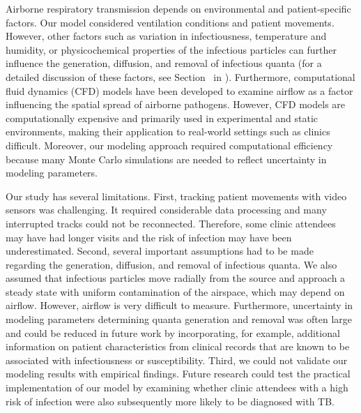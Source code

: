 \documentclass[fleqn,11pt]{wlscirep}
\begin{document}
Airborne respiratory transmission depends on environmental and patient-specific factors. Our model considered ventilation conditions and patient movements. However, other factors such as variation in infectiousness, temperature and humidity, or physicochemical properties of the infectious particles can further influence the generation, diffusion, and removal of infectious quanta (for a detailed discussion of these factors, see Section~ in \supp). Furthermore, computational fluid dynamics (CFD) models have been developed to examine airflow as a factor influencing the spatial spread of airborne pathogens\cite{Vuorinen2020SafSci,Jung2021InfectChemo,Li2021BuildEnv,Yan2023BE,Qian2009BE,Li2022SOTTE}. However, CFD models are computationally expensive and primarily used in experimental and static environments, making their application to real-world settings such as clinics difficult. Moreover, our modeling approach required computational efficiency because many Monte Carlo simulations are needed to reflect uncertainty in modeling parameters. 

Our study has several limitations. First, tracking patient movements with video sensors was challenging. It required considerable data processing and many interrupted tracks could not be reconnected. Therefore, some clinic attendees may have had longer visits and the risk of infection may have been underestimated. Second, several important assumptions had to be made regarding the generation, diffusion, and removal of infectious quanta.  We also assumed that infectious particles move radially from the source and approach a steady state with uniform contamination of the airspace, which may depend on airflow. However, airflow is very difficult to measure. Furthermore, uncertainty in modeling parameters determining quanta generation and removal was often large and could be reduced in future work by incorporating, for example, additional information on patient characteristics from clinical records that are known to be associated with infectiousness\cite{Escombe2008PLoSMed} or susceptibility\cite{Furin2019Lancet}. Third, we could not validate our modeling results with empirical findings. Future research could test the practical implementation of our model by examining whether clinic attendees with a high risk of infection were also subsequently more likely to be diagnosed with TB.  
\end{document}
